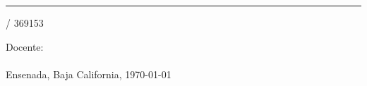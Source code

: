 
\begin{titlepage}

    \vspace*{2cm} %

    \begin{spacing}{}
        \centering
        \Huge{
            \textbf{\reportTitle}
        }
        \ifdefempty{\subtitle}{}{
            \par
            \Large{
                \textbf{\subtitle}
            }
        }
    \end{spacing}

    \hrule
    \vfill


    \begin{flushright}
        \LARGE{\nico}  / 369153
        \vspace{1cm}

        \subject\\ %

        \Large
        \Large{Docente: \teacherName }\\

        \course\\
        \university
        \vspace{1cm}
        Ensenada, Baja California, \today

    \end{flushright}
\end{titlepage}

\newcommand{\leftUpperHeader}{\subject}
